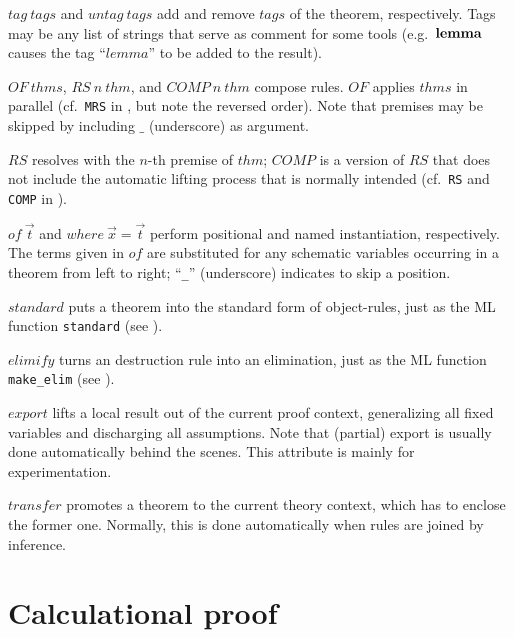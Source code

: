 \begin{descr}
\item [$tag~tags$ and $untag~tags$] add and remove $tags$ of the theorem,
  respectively.  Tags may be any list of strings that serve as comment for
  some tools (e.g.\ ${\mathord{\mathbf{lemma}}}$ causes the tag ``$lemma$'' to be added to the
  result).
\item [$OF~thms$, $RS~n~thm$, and $COMP~n~thm$] compose rules.  $OF$ applies
  $thms$ in parallel (cf.\ \texttt{MRS} in \cite[\S5]{isabelle-ref}, but note
  the reversed order).  Note that premises may be skipped by including $\_$
  (underscore) as argument.
  
  $RS$ resolves with the $n$-th premise of $thm$; $COMP$ is a version of $RS$
  that does not include the automatic lifting process that is normally
  intended (cf.\ \texttt{RS} and \texttt{COMP} in \cite[\S5]{isabelle-ref}).
  
\item [$of~\vec t$ and $where~\vec x = \vec t$] perform positional and named
  instantiation, respectively.  The terms given in $of$ are substituted for
  any schematic variables occurring in a theorem from left to right;
  ``\texttt{_}'' (underscore) indicates to skip a position.
 
\item [$standard$] puts a theorem into the standard form of object-rules, just
  as the ML function \texttt{standard} (see \cite[\S5]{isabelle-ref}).
  
\item [$elimify$] turns an destruction rule into an elimination, just as the
  ML function \texttt{make\_elim} (see \cite{isabelle-ref}).
  
\item [$export$] lifts a local result out of the current proof context,
  generalizing all fixed variables and discharging all assumptions.  Note that
  (partial) export is usually done automatically behind the scenes.  This
  attribute is mainly for experimentation.
  
\item [$transfer$] promotes a theorem to the current theory context, which has
  to enclose the former one.  Normally, this is done automatically when rules
  are joined by inference.

\end{descr}


\section{Calculational proof}\label{sec:calculation}

